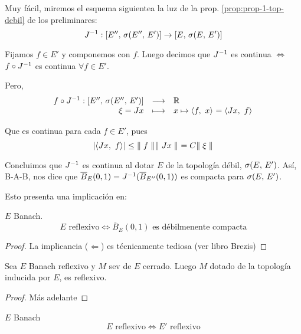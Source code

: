 Muy fácil, miremos el esquema siguientea la luz de la prop. \ref{prop:prop-1-top-debil} de los preliminares:
\begin{equation*}
    \deffuncs{J\inv}
    {[E'',\, \topdebil{E''}{E'}]}{[E,\, \topdebilE]}
\end{equation*}

Fijamos $f \in E'$ y componemos con $f$. Luego decimos que $J\inv$ es continua $\iff$ $f \circ J\inv$ es continua $\forall f \in E'$. 

Pero,
\begin{equation*}
    \deffunc{f \circ J \inv}
    {[E'',\, \topdebil{E''}{E'}]}{\rr}
    {\xi = Jx}{x \mapsto \prodint[]{f}{x} = \prodint[]{Jx}{f}
    }
\end{equation*}

Que es continua para cada $f \in E'$, pues
\begin{equation*}
    \abs{
    \prodint[]{Jx}{f}
    } 
    \leq \norm[]{f} \norm[]{Jx} = C \norm[]{\xi}
\end{equation*}

Concluimos que $J\inv$ es continua al dotar $E$ de la topología débil, $\topdebilE$. Así, B-A-B, nos dice que $\overline{B}_E (0,1) = J\inv (\overline{B}_{E''} (0,1))$ es compacta para $\topdebilE$.

Esto presenta una implicación en:
\begin{thm}
$E$ Banach.
\begin{equation*}
    E \text{ reflexivo} \iff \overline{B}_E(0, 1) \text{ es débilmenente compacta}
\end{equation*}
\end{thm}

\begin{proof}
La implicancia ($\Leftarrow$) es técnicamente tediosa (ver libro Brezis)
\end{proof}

\begin{prop}
Sea $E$ Banach reflexivo y $M$ sev de $E$ cerrado. Luego $M$ dotado de la topología inducida por $E$, es reflexivo.
\end{prop}

\begin{proof}
Más adelante
\end{proof}

\begin{cor}\label{cor:corolario-1}
$E$ Banach
\begin{equation*}
    E \text{ reflexivo} \iff E' \text{ reflexivo}
\end{equation*}
\end{cor}

